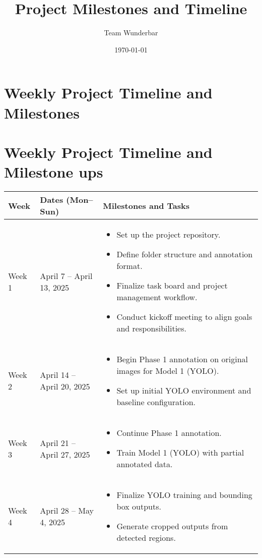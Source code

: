 \documentclass{article}
\title{Project Milestones and Timeline}
\author{Team Wunderbar}
\date{\today}
\begin{document}
\maketitle

\section*{Weekly Project Timeline and Milestones}
\section*{Weekly Project Timeline and Milestone ups}

\begin{longtable}{|p{2.5cm}|p{4.2cm}|p{8.5cm}|}
\hline
\textbf{Week} & \textbf{Dates (Mon–Sun)} & \textbf{Milestones and Tasks} \\
\hline
Week 1 & April 7 -- April 13, 2025 &
\begin{itemize}
    \item Set up the project repository.
    \item Define folder structure and annotation format.
    \item Finalize task board and project management workflow.
    \item Conduct kickoff meeting to align goals and responsibilities.
\end{itemize} \\
\hline
Week 2 & April 14 -- April 20, 2025 &
\begin{itemize}
    \item Begin Phase 1 annotation on original images for Model 1 (YOLO).
    \item Set up initial YOLO environment and baseline configuration.
\end{itemize} \\
\hline
Week 3 & April 21 -- April 27, 2025 &
\begin{itemize}
    \item Continue Phase 1 annotation.
    \item Train Model 1 (YOLO) with partial annotated data.
\end{itemize} \\
\hline
Week 4 & April 28 -- May 4, 2025 &
\begin{itemize}
    \item Finalize YOLO training and bounding box outputs.
    \item Generate cropped outputs from detected regions.
\end{itemize} \\

\end{longtable}
\end{document}
